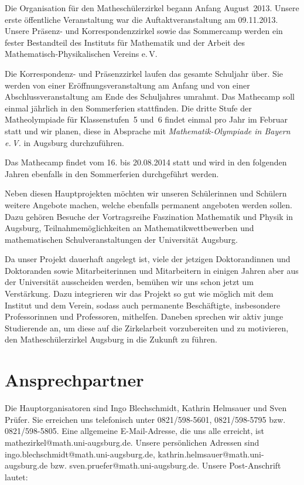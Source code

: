 \documentclass[12pt]{zettel}
\begin{document}
Die Organisation für den Matheschülerzirkel begann Anfang August~2013. Unsere
erste öffentliche Veranstaltung war die Auftaktveranstaltung am 09.11.2013.
Unsere Präsenz- und Korrespondenzzirkel sowie
das Sommercamp werden ein fester Bestandteil des Instituts für Mathematik und
der Arbeit des Mathematisch-Physikalischen Vereins e.\,V.

Die Korrespondenz- und Präsenzzirkel laufen
das gesamte Schuljahr über. Sie werden von einer
Eröffnungsveranstaltung am Anfang und von einer
Abschlussveranstaltung am Ende des Schuljahres umrahmt. Das Mathecamp soll
einmal jährlich in den Sommerferien stattfinden. Die dritte Stufe der
Matheolympiade für Klassenstufen~5 und~6 findet einmal pro Jahr
im Februar statt und wir planen, diese in
Absprache mit \emph{Mathematik-Olympiade in Bayern e.\,V.} in Augsburg
durchzuführen.

Das Mathecamp findet vom 16. bis 20.08.2014 statt und wird in den folgenden Jahren ebenfalls in den Sommerferien durchgeführt werden.

Neben diesen Hauptprojekten möchten wir unseren Schülerinnen und
Schülern weitere Angebote machen, welche ebenfalls permanent angeboten
werden sollen. Dazu gehören Besuche der Vortragsreihe Faszination
Mathematik und Physik in Augsburg, Teilnahmemöglichkeiten
an Mathematikwettbewerben und mathematischen Schulveranstaltungen der Universität Augsburg.

Da unser Projekt dauerhaft angelegt ist, viele der jetzigen Doktorandinnen und Doktoranden sowie Mitarbeiterinnen und Mitarbeitern in einigen Jahren aber aus der Universität ausscheiden werden,
bemühen wir uns schon jetzt um Verstärkung.
Dazu integrieren wir das Projekt so gut wie möglich mit
dem Institut und dem Verein, sodass auch permanente Beschäftigte,
insbesondere Professorinnen und Professoren, mithelfen. Daneben sprechen wir
aktiv junge Studierende an, um diese auf die Zirkelarbeit
vorzubereiten und zu motivieren, den Matheschülerzirkel
Augsburg in die Zukunft zu führen.


\section{Ansprechpartner}

Die Hauptorganisatoren sind Ingo Blechschmidt, Kathrin Helmsauer und Sven
Prüfer. Sie erreichen uns telefonisch unter 0821/598-5601, 0821/598-5795 bzw.
0821/598-5805. Eine allgemeine E-Mail-Adresse, die uns alle erreicht, ist
\textsf{mathezirkel@math.uni-augsburg.de}. Unsere persönlichen Adressen sind
\textsf{ingo.blechschmidt@math.uni-augsburg.de},
\textsf{kathrin.helmsauer@math.uni-augsburg.de} bzw.
\textsf{sven.pruefer@math.uni-augsburg.de}. Unsere Post-Anschrift lautet:
\end{document}
